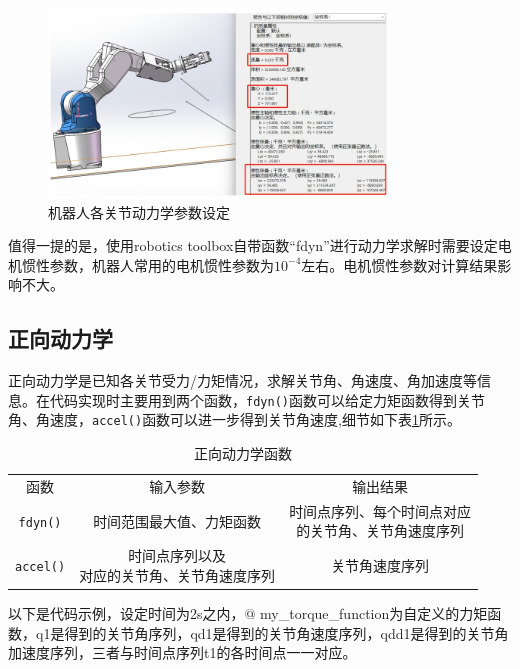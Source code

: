 \documentclass[12pt]{ctexart}
\begin{document}
\begin{figure}
    \centering
    \includegraphics[width=0.8\textwidth]{Image/fig99.png}
    \caption{机器人各关节动力学参数设定}
    \label{fig:99}
\end{figure}
值得一提的是，使用robotics toolbox自带函数“fdyn”进行动力学求解时需要设定电机惯性参数，机器人常用的电机惯性参数为$10^{-4}$左右。电机惯性参数对计算结果影响不大。 

\newpage
\subsection{正向动力学}
正向动力学是已知各关节受力/力矩情况，求解关节角、角速度、角加速度等信息。在代码实现时主要用到两个函数，\verb|fdyn()|函数可以给定力矩函数得到关节角、角速度，\verb|accel()|函数可以进一步得到关节角速度,细节如下表\ref{tab:fdyn}所示。

\begin{table}[htbp]
    \centering
    \caption{正向动力学函数}
    \label{tab:fdyn}
    \vspace{5pt}
    \begin{tabular}{ccc}
    \rowcolor[HTML]{5B9BD5} 
    函数                            & 输入参数                  & 输出结果                      \\
    \rowcolor[HTML]{BDD6EE} 
    \cellcolor[HTML]{5B9BD5}\verb|fdyn()|  & 时间范围最大值、力矩函数          & \makecell[c]{时间点序列、每个时间点对应\\的关节角、关节角速度序列} \\
    \rowcolor[HTML]{DEEAF6} 
    \cellcolor[HTML]{5B9BD5}\verb|accel()| & \makecell[c]{时间点序列以及\\对应的关节角、关节角速度序列} & 关节角速度序列                  
    \end{tabular}
\end{table}

以下是代码示例，设定时间为2s之内，$@$ my\_torque\_function为自定义的力矩函数，q1是得到的关节角序列，qd1是得到的关节角速度序列，qdd1是得到的关节角加速度序列，三者与时间点序列t1的各时间点一一对应。
\end{document}
